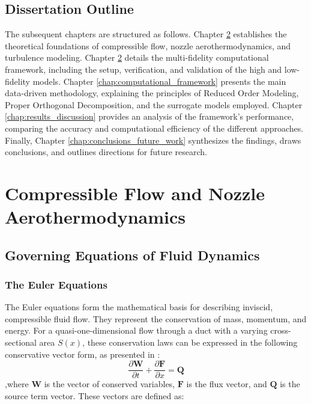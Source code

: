 \documentclass[tg, EN]{ufabcFHZh_tg}
\begin{document}
\section{Dissertation Outline}

The subsequent chapters are structured as follows. Chapter \ref{chap:governing_equations} establishes the theoretical foundations of compressible flow, nozzle aerothermodynamics, and turbulence modeling. Chapter \ref{chap:governing_equations} details the multi-fidelity computational framework, including the setup, verification, and validation of the high and low-fidelity models. Chapter \ref{chap:computational_framework} presents the main data-driven methodology, explaining the principles of Reduced Order Modeling, Proper Orthogonal Decomposition, and the surrogate models employed. Chapter \ref{chap:results_discussion} provides an analysis of the framework's performance, comparing the accuracy and computational efficiency of the different approaches. Finally, Chapter \ref{chap:conclusions_future_work} synthesizes the findings, draws conclusions, and outlines directions for future research.

\chapter{Compressible Flow and Nozzle Aerothermodynamics}
\label{chap:governing_equations}

\section{Governing Equations of Fluid Dynamics}

\subsection{The Euler Equations}

The Euler equations form the mathematical basis for describing inviscid, compressible fluid flow. They represent the conservation of mass, momentum, and energy. For a quasi-one-dimensional flow through a duct with a varying cross-sectional area $S(x)$, these conservation laws can be expressed in the following conservative vector form, as presented in \citep{anderson2003}:
\begin{equation}
    \frac{\partial \mathbf{W}}{\partial t} + \frac{\partial \mathbf{F}}{\partial x} = \mathbf{Q}
    \label{eq:euler_1d}
\end{equation}
,where $\mathbf{W}$ is the vector of conserved variables, $\mathbf{F}$ is the flux vector, and $\mathbf{Q}$ is the source term vector. These vectors are defined as:
\end{document}
